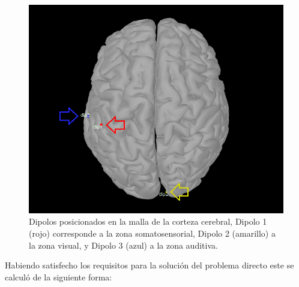 \begin{figure}[tbp]
	\centering
	\includegraphics[width=\textwidth]{gfx/dipoles.png}
	\caption{Dipolos posicionados en la malla de la corteza cerebral, Dipolo 1 (rojo) corresponde a la zona somatosensorial, Dipolo 2 (amarillo) a la zona visual, y Dipolo 3 (azul) a la zona auditiva.}
	\label{fig:dipoles}
\end{figure}

Habiendo satisfecho los requisitos para la solución del problema directo este se calculó de la siguiente forma:

